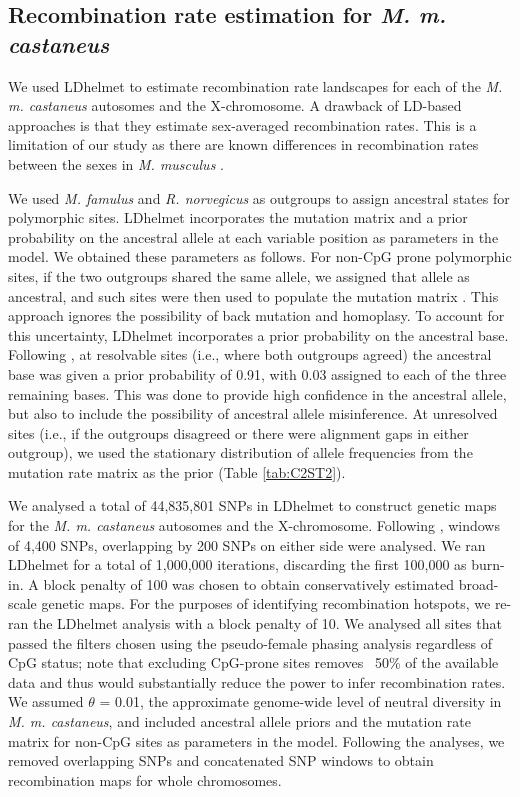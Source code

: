 \subsection{Recombination rate estimation for \textit{\textit{M. m. castaneus}}}
        	
         We used LDhelmet \citep{RN213} to estimate recombination rate landscapes for each of the \textit{M. m. castaneus} autosomes and the X-chromosome. A drawback of LD-based approaches is that they estimate sex-averaged recombination rates. This is a limitation of our study as there are known differences in recombination rates between the sexes in \textit{M. musculus} \citep{RN232,RN266}.
 
        	We used \textit{M. famulus} and \textit{R. norvegicus} as outgroups to assign ancestral states for polymorphic sites. LDhelmet incorporates the mutation matrix and a prior probability on the ancestral allele at each variable position as parameters in the model. We obtained these parameters as follows. For non-CpG prone polymorphic sites, if the two outgroups shared the same allele, we assigned that allele as ancestral, and such sites were then used to populate the mutation matrix \citep{RN213}. This approach ignores the possibility of back mutation and homoplasy. To account for this uncertainty, LDhelmet incorporates a prior probability on the ancestral base. Following \cite{RN258}, at resolvable sites (i.e., where both outgroups agreed) the ancestral base was given a prior probability of 0.91, with 0.03 assigned to each of the three remaining bases. This was done to provide high confidence in the ancestral allele, but also to include the possibility of ancestral allele misinference. At unresolved sites (i.e., if the outgroups disagreed or there were alignment gaps in either outgroup), we used the stationary distribution of allele frequencies from the mutation rate matrix as the prior (Table \ref{tab:C2ST2}).
 
We analysed a total of 44,835,801 SNPs in LDhelmet to construct genetic maps for the \textit{M. m. castaneus} autosomes and the X-chromosome. Following \cite{RN213}, windows of 4,400 SNPs, overlapping by 200 SNPs on either side were analysed. We ran LDhelmet for a total of 1,000,000 iterations, discarding the first 100,000 as burn-in. A block penalty of 100 was chosen to obtain conservatively estimated broad-scale genetic maps. For the purposes of identifying recombination hotspots, we re-ran the LDhelmet analysis with a block penalty of 10. We analysed all sites that passed the filters chosen using the pseudo-female phasing analysis regardless of CpG status; note that excluding CpG-prone sites removes ~50\% of the available data and thus would substantially reduce the power to infer recombination rates. We assumed $\theta$ = 0.01, the approximate genome-wide level of neutral diversity in \textit{M. m. castaneus}, and included ancestral allele priors and the mutation rate matrix for non-CpG sites as parameters in the model. Following the analyses, we removed overlapping SNPs and concatenated SNP windows to obtain recombination maps for whole chromosomes. 

